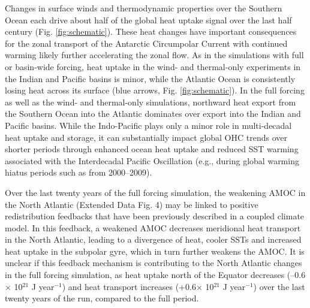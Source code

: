 \documentclass{nature}
\begin{document}
	Changes in surface winds and thermodynamic properties over the Southern Ocean each drive about half of the global heat uptake signal over the last half century (Fig. \ref{fig:schematic}). These heat changes have important consequences for the zonal transport of the Antarctic Circumpolar Current with continued warming likely further accelerating the zonal flow\cite{shi2021SOwarmingzonal}. As in the simulations with full or basin-wide forcing, heat uptake in the wind- and thermal-only experiments in the Indian and Pacific basins is minor, while the Atlantic Ocean is consistently losing heat across its surface (blue arrows, Fig. \ref{fig:schematic}). In the full forcing as well as the wind- and thermal-only simulations, northward heat export from the Southern Ocean into the Atlantic dominates over export into the Indian and Pacific basins. While the Indo-Pacific plays only a minor role in multi-decadal heat uptake and storage, it can substantially impact global OHC trends over shorter periods through enhanced ocean heat uptake and reduced SST warming associated with the Interdecadal Pacific Oscillation\cite{Meehl2011deepOHU} (e.g., during global warming hiatus periods such as from 2000--2009). 
	
	Over the last twenty years of the full forcing simulation, the weakening AMOC in the North Atlantic (Extended Data Fig. 4) may be linked to positive redistribution feedbacks that have been previously described in a coupled climate model\cite{Liu2020AMOC}. In this feedback, a weakened AMOC decreases meridional heat transport in the North Atlantic, leading to a divergence of heat, cooler SSTs and increased heat uptake in the subpolar gyre, which in turn further weakens the AMOC\cite{Couldrey2021SLChange,Liu2020AMOC}. It is unclear if this feedback mechanism is contributing to the North Atlantic changes in the full forcing simulation, as heat uptake north of the Equator decreases (--0.6$\times$ 10$^{21}$ J year$^{-1}$) and heat transport increases (+0.6$\times$ 10$^{21}$ J year$^{-1}$) over the last twenty years of the run, compared to the full period.
	
\end{document}
